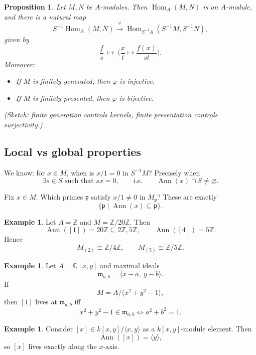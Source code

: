 \documentclass[11pt,a4paper]{article}
\theoremstyle{definition}
\newtheorem{example}[definition]{Example}
\theoremstyle{plain}
\newtheorem{proposition}[definition]{Proposition}
\theoremstyle{remark}
\newcommand{\Z}{\mathbb{Z}}
\newcommand{\C}{\mathbb{C}}
\newcommand{\Hom}{\operatorname{Hom}}
\newcommand{\Ann}{\operatorname{Ann}}
\begin{document}
\begin{proposition}
    Let $M,N$ be $A$-modules. Then $\Hom_A(M,N)$ is an $A$-module, and there is a natural map
    \[
    S^{-1}\Hom_A(M,N)
    \xrightarrow{\ \varphi\ }
    \Hom_{S^{-1}A}(S^{-1}M,S^{-1}N),
    \]
    given by
    \[
    \frac{f}{s}\ \longmapsto\ \Big(\frac{x}{t}\mapsto \frac{f(x)}{st}\Big).
    \]
    Moreover:
    \begin{itemize}
        \item If $M$ is finitely generated, then $\varphi$ is injective.
        \item If $M$ is finitely presented, then $\varphi$ is bijective.
    \end{itemize}
    (Sketch: finite generation controls kernels, finite presentation controls surjectivity.)
\end{proposition}

\subsection*{Local vs global properties}

We know: for $x\in M$, when is $x/1=0$ in $S^{-1}M$? Precisely when
\[
\exists s\in S\text{ such that }sx=0,
\qquad\text{i.e.}\qquad \Ann(x)\cap S\neq\varnothing.
\]

Fix $x\in M$. Which primes $\mathfrak p$ satisfy $x/1\neq 0$ in $M_{\mathfrak p}$?
These are exactly
\[
\{\mathfrak p\mid \Ann(x)\subseteq\mathfrak p\}.
\]

\begin{example}
    Let $A=\Z$ and $M=\Z/20\Z$. Then
    \[
    \Ann([1])=20\Z\subseteq 2\Z,5\Z,
    \qquad 
    \Ann([4])=5\Z.
    \]
    Hence
    \[
    M_{(2)}\cong \Z/4\Z,
    \qquad 
    M_{(5)}\cong \Z/5\Z.
    \]
\end{example}

\begin{example}
    Let $A=\C[x,y]$ and maximal ideals
    \[
    \mathfrak m_{a,b}=\langle x-a,\ y-b\rangle.
    \]
    If
    \[
    M=A/\langle x^2+y^2-1\rangle,
    \]
    then $[1]$ lives at $\mathfrak m_{a,b}$ iff
    \[
    x^2+y^2-1\in\mathfrak m_{a,b}
    \iff a^2+b^2=1.
    \]
\end{example}

\begin{example}
    Consider $[x]\in k[x,y]/\langle x,y\rangle$ as a $k[x,y]$-module element. Then
    \[
    \Ann([x])=\langle y\rangle,
    \]
    so $[x]$ lives exactly along the $x$-axis.
\end{example}
\end{document}
